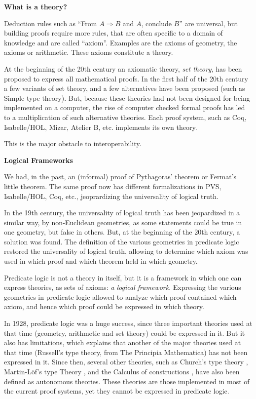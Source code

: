 \begin{framed}
\begin{center}
{\bf \Large What is a theory?}
\end{center}

Deduction rules such as ``From $A \Rightarrow B$ and $A$, conclude
$B$'' are universal, but building proofs require more rules, that are
often specific to a domain of knowledge and are called
``axiom''. Examples are the axioms of geometry, the axioms or
arithmetic. These axioms constitute a theory.

At the beginning of the 20th century an axiomatic theory, {\em set
  theory}, has been proposed to express all mathematical proofs. In
the first half of the 20th century a few variants of set theory, and a
few alternatives have been proposed (such as Simple type theory).
But, because these theories had not been designed for being
implemented on a computer, the rise of computer checked formal proofs
has led to a multiplication of such alternative theories. Each proof system,
such as Coq, Isabelle/HOL, Mizar, Atelier B,
etc. implements its own theory.

This is the major obstacle to interoperability.
\end{framed}

\bigskip

\noindent
{\bf \Large Logical Frameworks}

We had, in the past, an (informal) proof of Pythagoras’ theorem
or Fermat’s little theorem. The same proof now has different
formalizations in PVS, Isabelle/HOL, Coq, etc., jeoprardizing the
universality of logical truth.

In the 19th century, the universality of logical truth has been
jeopardized in a similar way, by non-Euclidean geometries, as some
statements could be true in one geometry, but false in others.  But,
at the beginning of the 20th century, a solution was found.  The
definition of the various geometries in predicate logic
\cite{HilbertAckermann} restored the universality of logical truth,
allowing to determine which axiom was used in which proof and which
theorem held in which geometry.

Predicate logic is not a theory in itself, but it is a framework in
which one can express theories, as sets of axioms: {\em a logical
  framework}.  Expressing the various geometries in predicate logic
allowed to analyze which proof contained which axiom, and hence which
proof could be expressed in which theory.

In 1928, predicate logic was a huge success, since three important
theories used at that time (geometry, arithmetic and set theory) could
be expressed in it. But it also has limitations, which explains that
another of the major theories used at that time (Russell's type
theory, from The Principia Mathematica) has not been expressed in
it. Since then, several other theories, such as Church's type theory
\cite{Church40}, Martin-L\"of's type Theory \cite{Martin-Lof84}, and
the Calculus of constructions \cite{CoquandHuet88}, have also been
defined as autonomous theories. These theories are those implemented
in most of the current proof systems, yet they cannot be expressed in
predicate logic.

